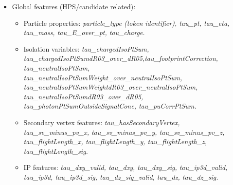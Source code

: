 \begin{itemize}
	\item Global features (HPS/\tauh candidate related):
	\begin{itemize}
		\item Particle properties: \textit{particle\_type (token identifier), tau\_pt, tau\_eta, tau\_mass, tau\_E\_over\_pt, tau\_charge.}
			
		\item Isolation variables: \textit{tau\_chargedIsoPtSum, tau\_chargedIsoPtSumdR03\_over\_dR05,tau\_footprintCorrection, tau\_neutralIsoPtSum, tau\_neutralIsoPtSumWeight\_over\_neutralIsoPtSum, tau\_neutralIsoPtSumWeightdR03\_over\_neutralIsoPtSum, tau\_neutralIsoPtSumdR03\_over\_dR05, tau\_photonPtSumOutsideSignalCone, tau\_puCorrPtSum.} 
		
		\item Secondary vertex features: \textit{tau\_hasSecondaryVertex, tau\_sv\_minus\_pv\_x, tau\_sv\_minus\_pv\_y, tau\_sv\_minus\_pv\_z, tau\_flightLength\_x, tau\_flightLength\_y, tau\_flightLength\_z, tau\_flightLength\_sig.}
		
		\item IP features: \textit{tau\_dxy\_valid, tau\_dxy, tau\_dxy\_sig, tau\_ip3d\_valid, tau\_ip3d, tau\_ip3d\_sig, tau\_dz\_sig\_valid, tau\_dz, tau\_dz\_sig.}
	

\end{itemize}
\end{itemize}
